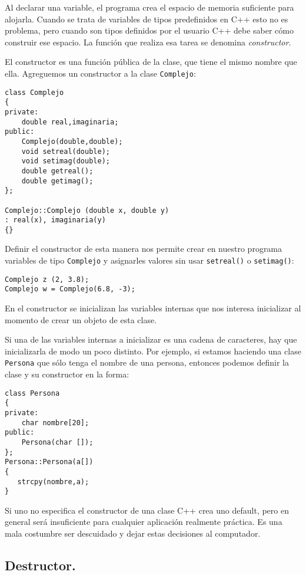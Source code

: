 Al declarar una variable, el programa crea el espacio de memoria
suficiente para alojarla. Cuando se trata de variables de tipos
predefinidos en C++ esto no es problema, pero cuando son tipos
definidos por el usuario C++ debe saber c{\'o}mo construir ese espacio.
La funci{\'o}n que realiza esa tarea se denomina {\em constructor}. 

El constructor es una funci{\'o}n p{\'u}blica de la clase, que tiene el
mismo nombre que ella. Agreguemos un constructor a la clase
\verb+Complejo+: 
\begin{verbatim}
class Complejo
{
private:
    double real,imaginaria;
public:
    Complejo(double,double);
    void setreal(double);
    void setimag(double);
    double getreal();
    double getimag();
};

Complejo::Complejo (double x, double y)
: real(x), imaginaria(y)
{}
\end{verbatim}
Definir el constructor de esta manera nos permite crear en nuestro
programa variables de tipo \verb+Complejo+ y asignarles
valores sin usar \verb+setreal()+ o \verb+setimag()+:
\begin{verbatim}
Complejo z (2, 3.8);
Complejo w = Complejo(6.8, -3);
\end{verbatim}

En el constructor se inicializan las variables internas que nos
interesa inicializar al momento de crear un objeto de esta clase. 

Si una de las variables internas a inicializar es una cadena de
caracteres, hay que inicializarla de modo un poco distinto. Por
ejemplo, si estamos 
haciendo una clase \verb+Persona+ que s{\'o}lo tenga el nombre de una
persona, entonces podemos definir la clase y su constructor en la
forma: 
\begin{verbatim}
class Persona
{
private:
    char nombre[20];
public:
    Persona(char []);
};
Persona::Persona(a[])
{
   strcpy(nombre,a);
}
\end{verbatim}

Si uno no especifica el constructor de una clase C++ crea uno default,
pero en general ser{\'a} insuficiente para cualquier aplicaci{\'o}n
realmente pr{\'a}ctica. Es una mala costumbre ser descuidado y dejar
estas decisiones al computador.

\subsection{Destructor.}

